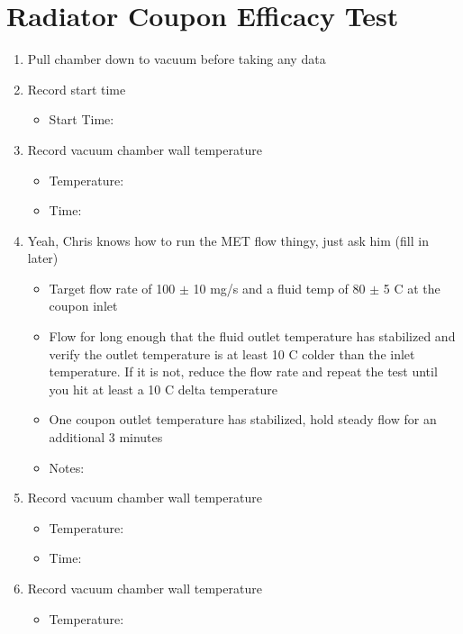 \documentclass[11pt]{article}
\begin{document}
    \section{Radiator Coupon Efficacy Test}
        \begin{enumerate}
            \item Pull chamber down to vacuum before taking any data
            \item Record start time
            \begin{itemize}
                \item Start Time: 
            \end{itemize}
            \item Record vacuum chamber wall temperature
            \begin{itemize}
                \item Temperature: 
                \item Time: 
            \end{itemize}
            \item Yeah, Chris knows how to run the MET flow thingy, just ask him (fill in later)
            \begin{itemize}
                \item Target flow rate of 100 $\pm$ 10 mg/s and a fluid temp of 80 $\pm$ 5 C at the coupon inlet
                \item Flow for long enough that the fluid outlet temperature has stabilized and verify the outlet temperature is at least 10 C colder than the inlet temperature. If it is not, reduce the flow rate and repeat the test until you hit at least a 10 C delta temperature
                \item One coupon outlet temperature has stabilized, hold steady flow for an additional 3 minutes
                \item Notes: 
            \end{itemize}
            \item Record vacuum chamber wall temperature
            \begin{itemize}
                \item Temperature: 
                \item Time: 
            \end{itemize}
            \item Record vacuum chamber wall temperature
            \begin{itemize}
                \item Temperature: 

\end{itemize}
\end{enumerate}
\end{document}
